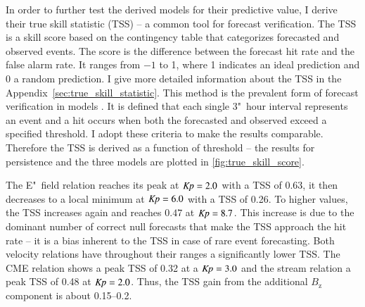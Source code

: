 In order to further test the derived models for their predictive value, I derive their true skill statistic (TSS) -- a common tool for forecast verification. The TSS is a skill score based on the contingency table that categorizes forecasted and observed events. The score is the difference between the forecast hit rate and the false alarm rate. It ranges from $-1$ to 1, where 1 indicates an ideal prediction and 0 a random prediction. I give more detailed information about the TSS in the Appendix~\ref{sec:true_skill_statistic}. This method is the prevalent form of forecast verification in \Kp{} models \citep{Detman1999,Wing2005,Savani2017}. It is defined that each single 3"~hour \Kp{} interval represents an event and a hit occurs when both the forecasted and observed \Kp{} exceed a specified threshold. I adopt these criteria to make the results comparable. Therefore the TSS is derived as a function of \Kp{} threshold -- the results for persistence and the three models are plotted in \autoref{fig:true_skill_score}.
\begin{figure}[htb]
\end{figure}

The E"~field relation reaches its peak at $\text{\textit{Kp}} = 2.0$ with a TSS of 0.63, it then decreases to a local minimum at $\text{\textit{Kp}} = 6.0$ with a TSS of 0.26. To higher \Kp{} values, the TSS increases again and reaches $0.47$ at $\text{\textit{Kp}} = 8.7$. This increase is due to the dominant number of correct null forecasts that make the TSS approach the hit rate \citep{Doswell1990} -- it is a bias inherent to the TSS in case of rare event forecasting. Both velocity relations have throughout their \Kp{} ranges a significantly lower TSS. The CME relation shows a peak TSS of 0.32 at a $\text{\textit{Kp}} = 3.0$ and the stream relation a peak TSS of 0.48 at $\text{\textit{Kp}} = 2.0$. Thus, the TSS gain from the additional $B_\text{z}$ component is about \numrange{0.15}{0.2}.

